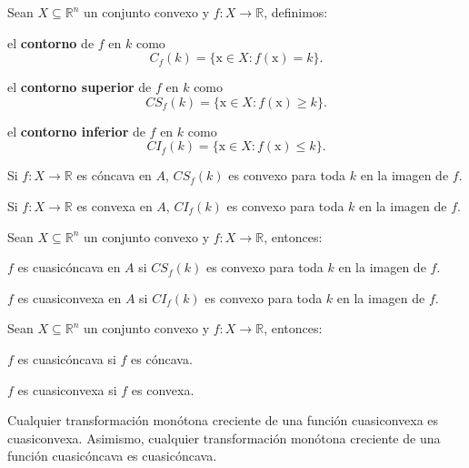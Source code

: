 \documentclass[8pt,a4paper]{extarticle}
\begin{document}
\begin{multicols}{3}
	\begin{boxdef}
		Sean $X \subseteq \mathbb{R}^n$ un conjunto convexo y $f : X \to \mathbb{R}$, definimos:
		\begin{bulletlist}
			\item el \textbf{contorno} de $f$ en $k$ como $$C_f(k) = \{\mathrm{x} \in X : f(\mathrm{x}) = k\}.$$
			\item el \textbf{contorno superior} de $f$ en $k$ como $$CS_f(k) = \{\mathrm{x} \in X : f(\mathrm{x}) \ge k\}.$$
			\item el \textbf{contorno inferior} de $f$ en $k$ como $$CI_f(k) = \{\mathrm{x} \in X : f(\mathrm{x}) \le k\}.$$
		\end{bulletlist}
	\end{boxdef}

	\begin{boxtheo}[]
		\begin{eqlist}
			\item Si $f : X \to \mathbb{R}$ es cóncava en $A$, $CS_f(k)$ es convexo para toda $k$ en la imagen de $f$.
			\item Si $f : X \to \mathbb{R}$ es convexa en $A$, $CI_f(k)$ es convexo para toda $k$ en la imagen de $f$.
		\end{eqlist}
	\end{boxtheo}

	\begin{boxtheo}[]
		Sean $X \subseteq \mathbb{R}^n$ un conjunto convexo y $f : X \to \mathbb{R}$, entonces:
		\begin{eqlist}
			\item $f$ es cuasicóncava en $A$ si $CS_f (k)$ es convexo para toda $k$ en la imagen de $f$.
			\item $f$ es cuasiconvexa en $A$ si $CI_f (k)$ es convexo para toda $k$ en la imagen de $f$.
		\end{eqlist}
	\end{boxtheo}

	\begin{boxtheo}[]
		Sean $X \subseteq \mathbb{R}^n$ un conjunto convexo y $f : X \to \mathbb{R}$, entonces:
		\begin{eqlist}
			\item $f$ es cuasicóncava si $f$ es cóncava.
			\item $f$ es cuasiconvexa si $f$ es convexa.
		\end{eqlist}
	\end{boxtheo}

	\begin{boxtheo}[]
		Cualquier transformación monótona creciente de una función cuasiconvexa es cuasiconvexa. Asimismo, cualquier transformación monótona creciente de una función cuasicóncava es cuasicóncava.
	\end{boxtheo}


\end{multicols}
\end{document}

